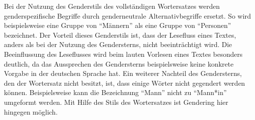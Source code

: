 Bei der Nutzung des Genderstils des vollständigen Wortersatzes werden genderspezifische Begriffe durch genderneutrale Alternativbegriffe ersetzt. So wird beispielsweise eine Gruppe von ``Männern'' als eine Gruppe von ``Personen'' bezeichnet. Der Vorteil dieses Genderstils ist, dass der Lesefluss eines Textes, anders als bei der Nutzung des Gendersterns, nicht beeinträchtigt wird. Die Beeinflussung des Leseflusses wird beim lauten Vorlesen eines Textes besonders deutlich, da das Aussprechen des Gendersterns beispielsweise keine konkrete Vorgabe in der deutschen Sprache hat. Ein weiterer Nachteil des Gendersterns, den der Wortersatz nicht besitzt, ist, dass einige Wörter nicht gegendert werden können. Beispielsweise kann die Bezeichnung ``Mann'' nicht zu ``Mann*in'' umgeformt werden. Mit Hilfe des Stils des Wortersatzes ist Gendering hier hingegen möglich.